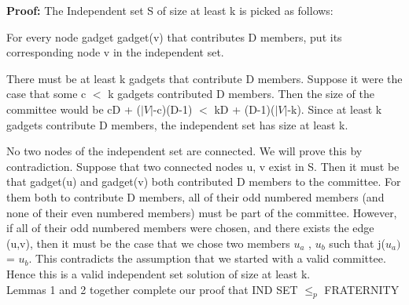 \textbf{Proof:}
The Independent set S of size at least k is picked as follows:

For every node gadget gadget(v) that contributes D members, put its corresponding node v in the independent set.

There must be at least k gadgets that contribute D members. Suppose it were the case that some c $<$ k gadgets contributed D members. Then the size of the committee would be cD + ($|V|$-c)(D-1) $<$ kD + (D-1)($|V|$-k). Since at least k gadgets contribute D members, the independent set has size at least k.

No two nodes of the independent set are connected. We will prove this by contradiction. Suppose that two connected nodes u, v exist in S. Then it must be that gadget(u) and gadget(v) both contributed D members to the committee. For them both to contribute D members, all of their odd numbered members (and none of their even numbered members) must be part of the committee. However, if all of their odd numbered members were chosen, and there exists the edge (u,v), then it must be the case that we chose two members $u_a$ , $u_b$ such that j($u_a)$ = $u_b$. This contradicts the assumption that we started with a valid committee. Hence this is a valid independent set solution of size at least k.\\

Lemmas 1 and 2 together complete our proof that IND SET $\leq_p$ FRATERNITY
